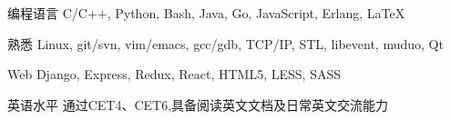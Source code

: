 

\begin{cvskills}

  \cvskill
    {编程语言} %
    {C/C++, Python, Bash, Java, Go, JavaScript, Erlang, \LaTeX} %

  \cvskill
    {熟悉} %
    {Linux, git/svn, vim/emacs, gcc/gdb, TCP/IP, STL, libevent, muduo, Qt} %

  \cvskill
    {Web} %
    {Django, Express, Redux, React, HTML5, LESS, SASS} %

  \cvskill
    {英语水平} %
    {通过CET4、CET6,具备阅读英文文档及日常英文交流能力} %

\end{cvskills}
